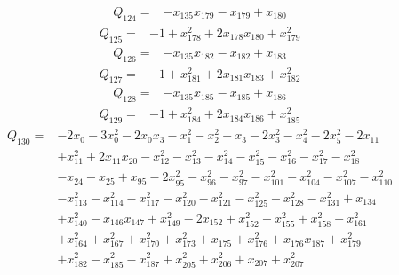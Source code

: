 \begin{equation*}\begin{aligned}
Q_{124}={}& -x_{135}x_{179}-x_{179}+x_{180}
\end{aligned}\end{equation*}
\begin{equation*}\begin{aligned}
Q_{125}={}& -1+x_{178}^{2}+2x_{178}x_{180}+x_{179}^{2}
\end{aligned}\end{equation*}
\begin{equation*}\begin{aligned}
Q_{126}={}& -x_{135}x_{182}-x_{182}+x_{183}
\end{aligned}\end{equation*}
\begin{equation*}\begin{aligned}
Q_{127}={}& -1+x_{181}^{2}+2x_{181}x_{183}+x_{182}^{2}
\end{aligned}\end{equation*}
\begin{equation*}\begin{aligned}
Q_{128}={}& -x_{135}x_{185}-x_{185}+x_{186}
\end{aligned}\end{equation*}
\begin{equation*}\begin{aligned}
Q_{129}={}& -1+x_{184}^{2}+2x_{184}x_{186}+x_{185}^{2}
\end{aligned}\end{equation*}
\begin{equation*}\begin{aligned}
Q_{130}={}& -2x_{0}-3x_{0}^{2}-2x_{0}x_{3}-x_{1}^{2}-x_{2}^{2}-x_{3}-2x_{3}^{2}-x_{4}^{2}-2x_{5}^{2}-2x_{11}\\
& +x_{11}^{2}+2x_{11}x_{20}-x_{12}^{2}-x_{13}^{2}-x_{14}^{2}-x_{15}^{2}-x_{16}^{2}-x_{17}^{2}-x_{18}^{2}\\
& -x_{24}-x_{25}+x_{95}-2x_{95}^{2}-x_{96}^{2}-x_{97}^{2}-x_{101}^{2}-x_{104}^{2}-x_{107}^{2}-x_{110}^{2}\\
& -x_{113}^{2}-x_{114}^{2}-x_{117}^{2}-x_{120}^{2}-x_{121}^{2}-x_{125}^{2}-x_{128}^{2}-x_{131}^{2}+x_{134}\\
& +x_{140}^{2}-x_{146}x_{147}+x_{149}^{2}-2x_{152}+x_{152}^{2}+x_{155}^{2}+x_{158}^{2}+x_{161}^{2}\\
& +x_{164}^{2}+x_{167}^{2}+x_{170}^{2}+x_{173}^{2}+x_{175}+x_{176}^{2}+x_{176}x_{187}+x_{179}^{2}\\
& +x_{182}^{2}-x_{185}^{2}-x_{187}^{2}+x_{205}^{2}+x_{206}^{2}+x_{207}+x_{207}^{2}
\end{aligned}\end{equation*}

